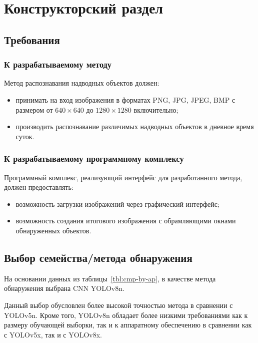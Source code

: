 \chapter{Конструкторский раздел}

\section{Требования}

\subsection*{К разрабатываемому методу}

Метод распознавания надводных объектов должен:
\begin{itemize}[label=---]
    \item принимать на вход изображения в форматах PNG, JPG, JPEG, BMP с размером от $640 \times 640$ до $1280 \times 1280$ включительно;
    \item производить распознавание различимых надводных объектов в дневное время суток.
\end{itemize}

\subsection*{К разрабатываемому программному комплексу}

Программный комплекс, реализующий интерфейс для разработанного метода, должен предоставлять:
\begin{itemize}[label=---]
    \item возможность загрузки изображений через графический интерфейс;
    \item возможность создания итогового изображения с обрамляющими окнами обнаруженных объектов.
\end{itemize}

\section{Выбор семейства/метода обнаружения}

На основании данных из таблицы~\ref{tbl:cmp-by-ap}, в качестве метода обнаружения выбрана CNN YOLOv8n.

Данный выбор обусловлен более высокой точностью метода в сравнении с YOLOv5n. Кроме того, YOLOv8n обладает более низкими требованиями как к размеру обучающей выборки, так и к аппаратному обеспечению в сравнении как с YOLOv5x, так и с YOLOv8x.

